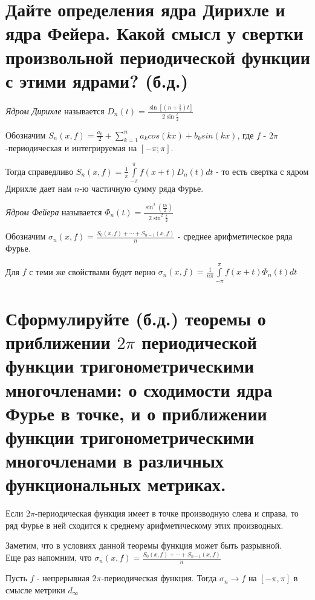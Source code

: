 \documentclass{article}
\begin{document}
	\section{Дайте определения ядра Дирихле и ядра Фейера. Какой смысл у свертки произвольной периодической функции с этими ядрами? (б.д.)}
	
	\begin{definition}
		\textit{Ядром Дирихле} называется $D_n(t)=\frac{\sin[(n+\frac{1}{2})t]}{2\sin{\frac{t}{2}}}$
	\end{definition}

	Обозначим $S_n(x,f)=\frac{a_0}{2} + \sum_{k=1}^{n} a_k cos(kx) + b_k sin(kx)$, где $f$ - $2\pi$-периодическая и интегрируемая на $[-\pi; \pi]$. 
	
	Тогда справедливо $S_n(x, f)=\frac{1}{\pi}\int\limits_{-\pi}^{\pi}f(x+t)D_n(t) dt$ - то есть свертка с ядром Дирихле дает нам $n$-ю частичную сумму ряда Фурье.

	\begin{definition}
		\textit{Ядром Фейера} называется $\Phi_n(t)=\frac{\sin^2(\frac{tn}{2})}{2\sin^2{\frac{t}{2}}}$
	\end{definition}

	Обозначим $\sigma_n(x,f)=\frac{S_0(x, f)+\cdots+S_{n-1}(x, f)}{n}$ - среднее арифметическое ряда Фурье. 
	
	Для $f$ с теми же свойствами будет верно $\sigma_n(x, f)=\frac{1}{n\pi}\int\limits_{-\pi}^{\pi}f(x+t)\Phi_n(t) dt$
	 
	\section{Сформулируйте (б.д.) теоремы о приближении $2\pi$ периодической функции тригонометрическими многочленами: о сходимости ядра Фурье в точке, и о приближении функции тригонометрическими многочленами в различных функциональных метриках.} 
	
	\begin{theorem} 
		Если $2\pi$-периодическая функция имеет в точке производную слева и справа, то ряд Фурье в ней сходится к среднему арифметическому этих производных.
	\end{theorem}

	Заметим, что в условиях данной теоремы функция может быть разрывной.\\
	
	Еще раз напомним, что $\sigma_n(x,f)=\frac{S_0(x, f)+\cdots+S_{n-1}(x, f)}{n}$
	
	\begin{theorem} 
		Пусть $f$ - непрерывная $2\pi$-периодическая функция. Тогда $\sigma_n \rightarrow f$ на $[-\pi, \pi]$ в смысле метрики $d_{\infty}$
	\end{theorem}
\end{document}
